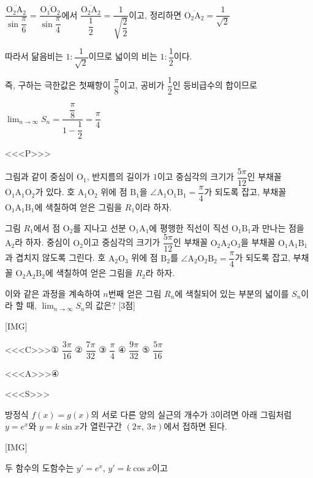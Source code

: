 \documentclass{oblivoir}
\begin{document}
$\overline{\dfrac{\mathrm{O}_{2} \mathrm{A}_{2}}{\sin\dfrac{\pi}{6}}}=\overline{\dfrac{\mathrm{O}_{1} \mathrm{O}_{2}}{\sin\dfrac{\pi}{4}}}$에서 $\overline{\dfrac{\mathrm{O}_{2} \mathrm{A}_{2}}{\dfrac{1}{2}}}=\dfrac{1}{\sqrt{\dfrac{2}{2}}}$이고, 정리하면 $\overline{\mathrm{O_{2}A_{2}}}=\dfrac{1}{\sqrt{2}}$

따라서 닮음비는 $1 :\dfrac{1}{\sqrt{2}}$이므로 넓이의 비는 $1 :\dfrac{1}{2}$이다.

즉, 구하는 극한값은 첫째항이 $\dfrac{\pi}{8}$이고, 공비가 $\dfrac{1}{2}$인 등비급수의 합이므로

$\displaystyle\lim_{n\to \infty}S_{n}=\dfrac{\dfrac{\pi}{8}}{1-\dfrac{1}{2}}=\dfrac{\pi}{4}$

<<<P>>>

그림과 같이 중심이 $\mathrm{O}_{1}$, 반지름의 길이가 $1$이고 중심각의 크기가 $\dfrac{5\pi}{12}$인 부채꼴 $\mathrm{O}_{1}\mathrm{A}_{1}\mathrm{O}_{2}$가 있다. 호 $\mathrm{A}_{1}\mathrm{O}_{2}$ 위에 점 $\mathrm{B}_{1}$을 $\angle\mathrm{A}_{1}\mathrm{O}_{1}\mathrm{B}_{1}=\dfrac{\pi}{4}$가 되도록 잡고, 부채꼴 $\mathrm{O}_{1}\mathrm{A}_{1}\mathrm{B}_{1}$에 색칠하여 얻은 그림을 $R_{1}$이라 하자.

그림 $R_{1}$에서 점 $\mathrm{O}_{2}$를 지나고 선분 $\mathrm{O}_{1}\mathrm{A}_{1}$에 평행한 직선이 직선 $\mathrm{O}_{1}\mathrm{B}_{1}$과 만나는 점을 $\mathrm{A}_{2}$라 하자. 중심이 $\mathrm{O}_{2}$이고 중심각의 크기가 $\dfrac{5\pi}{12}$인 부채꼴 $\mathrm{O}_{2}\mathrm{A}_{2}\mathrm{O}_{3}$을 부채꼴 $\mathrm{O}_{1}\mathrm{A}_{1}\mathrm{B}_{1}$과 겹치지 않도록 그린다. 호 $\mathrm{A}_{2}\mathrm{O}_{3}$ 위에 점 $\mathrm{B}_{2}$를 $\angle\mathrm{A}_{2}\mathrm{O}_{2}\mathrm{B}_{2}=\dfrac{\pi}{4}$가 되도록 잡고, 부채꼴 $\mathrm{O}_{2}\mathrm{A}_{2}\mathrm{B}_{2}$에 색칠하여 얻은 그림을 $R_{2}$라 하자.

이와 같은 과정을 계속하여 $n$번째 얻은 그림 $R_{n}$에 색칠되어 있는 부분의 넓이를 $S_{n}$이라 할 때, $\displaystyle\lim_{n\to \infty}S_{n}$의 값은? [3점]

[IMG]

<<<C>>>① $\dfrac{3\pi}{16}$ ② $\dfrac{7\pi}{32}$ ③ $\dfrac{\pi}{4}$ ④ $\dfrac{9\pi}{32}$ ⑤ $\dfrac{5\pi}{16}$

<<<A>>>④

<<<S>>>

방정식 $f(x)=g(x)$의 서로 다른 양의 실근의 개수가 $3$이려면 아래 그림처럼 $y=e^{x}$와 $y=k\sin x$가 열린구간 $(2\pi ,\: 3\pi)$에서 접하면 된다.

[IMG]

두 함수의 도함수는 $y'=e^{x}$, $y'= k\cos x$이고
\end{document}
